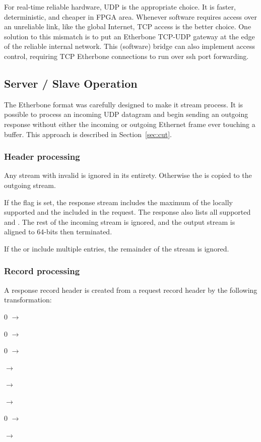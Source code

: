 \documentclass{article}
\newenvironment{packed_itemize}{
\begin{itemize}
  \setlength{\itemsep}{1pt}
  \setlength{\parskip}{0pt}
  \setlength{\parsep}{0pt}
}{\end{itemize}}
\begin{document}
For real-time reliable hardware, UDP is the appropriate choice.
It is faster, deterministic, and cheaper in FPGA area.
Whenever software requires access over an unreliable link,
like the global Internet,
TCP access is the better choice.
One solution to this mismatch is to put an Etherbone TCP-UDP gateway
at the edge of the reliable internal network.
This (software) bridge can also implement access control,
requiring TCP Etherbone connections to run over ssh port forwarding.

\subsection{Server / Slave Operation}

The Etherbone format was carefully designed to make it stream process.
It is possible to process an incoming UDP datagram and
begin sending an outgoing response 
without either the incoming or outgoing Ethernet frame ever touching a buffer.
This approach is described in Section~\ref{sec:cut}.

\subsubsection{Header processing}

Any stream with invalid  is ignored in its entirety.
Otherwise the  is copied to the outgoing stream.

If the  flag is set,
the response stream includes the maximum of the locally supported
 and the  included in the request.
The response also lists all supported  and .
The rest of the incoming stream is ignored,
and the output stream is aligned to 64-bits then terminated.

If the  or  include multiple entries, 
the remainder of the stream is ignored.

\subsubsection{Record processing}

A response record header is created from a request record header by the
following transformation:
\begin{packed_itemize}
\item 0 $\to$ 
\item 0 $\to$ 
\item 0 $\to$ 
\item {} $\to$ 
\item {} $\to$ 
\item {} $\to$ 
\item 0 $\to$ 
\item {} $\to$ 
\end{packed_itemize}
\end{document}
